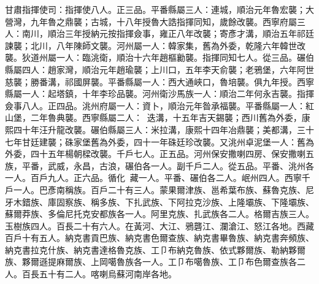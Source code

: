 \begin{pinyinscope}
甘肅指揮使司：指揮使八人。正三品。平番縣屬三人：連城，順治元年魯宏襲；大營灣，九年魯之鼎襲；古城，十八年授魯大誥指揮同知，歲餘改襲。西寧府屬三人：南川，順治三年授納元按指揮僉事，雍正八年改襲；寄彥才溝，順治五年祁廷諫襲；北川，八年陳師文襲。河州屬一人：韓家集，舊為外委，乾隆六年韓世改襲。狄道州屬一人：臨洮衛，順治十六年趙樞勷襲。指揮同知七人。從三品。碾伯縣屬四人：趙家灣，順治元年趙瑜襲；上川口，五年李天俞襲；老鴉堡，六年阿世慈襲；勝番溝，祁國屏襲。平番縣屬一人：西大通峽口，魯培襲。俱九年授。西寧縣屬一人：起塔鎮，十年李珍品襲。河州衛沙馬族一人：順治二年何永吉襲。指揮僉事八人。正四品。洮州府屬一人：資卜，順治元年昝承福襲。平番縣屬一人：紅山堡，二年魯典襲。西寧縣屬二人：迭溝，十五年吉天錫襲；西川舊為外委，康熙四十年汪升龍改襲。碾伯縣屬三人：米拉溝，康熙十四年冶鼎襲；美都溝，三十七年甘廷建襲；硃家堡舊為外委，四十一年硃廷珍改襲。又洮州卓泥堡一人：舊為外委，四十五年楊朝樑改襲。千戶七人。正五品。河州保安撒喇四房、保安撒喇五族，平番，武威，永昌，古浪，碾伯各一人。副千戶二人。從五品。平番、洮州各一人。百戶九人。正六品。循化藏一人。平番、碾伯各二人。岷州四人。西寧千戶一人。巴彥南稱族。百戶二十有三人。蒙果爾津族、邕希葉布族、蘇魯克族、尼牙木錯族、庫固察族、稱多族、下扎武族、下阿拉克沙族、上隆壩族、下隆壩族、蘇爾莽族、多倫尼托克安都族各一人。阿里克族、扎武族各二人。格爾吉族三人。玉樹族四人。百長二十有六人。在黃河、大江、鴉礱江、瀾滄江、怒江各地。西藏百戶十有五人。納克書貢巴族、納克書色爾查族、納克書畢魯族、納克書奔頻族、納克書拉克什族、納克書達格魯克族、工⼙布納克魯族、依式夥爾族、勒納夥爾族、夥爾遜提麻爾族、上岡噶魯族各一人。工⼙布噶魯族、工⼙布色爾查族各二人。百長五十有二人。喀喇烏蘇河南岸各地。


\end{pinyinscope}

